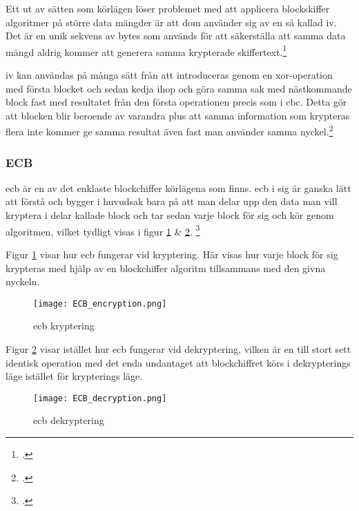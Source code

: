 Ett ut av sätten som körlägen löser problemet med att applicera blockskiffer algoritmer på
större data mängder är att dom använder sig av en så kallad \acrfull{iv}. Det är en unik sekvens
av bytes som används för att säkerställa att samma data mängd aldrig kommer att generera samma
krypterade skiffertext.\footcite{modesofoperation}

\acrshort{iv} kan användas på många sätt från att introduceras genom en
\gls{xor}-operation med första blocket och sedan kedja ihop och göra samma sak med nästkommande
block fast med resultatet från den första operationen precis som i \acrshort{cbc}. Detta gör att blocken blir beroende av varandra
plus att samma information som krypteras flera inte kommer ge samma resultat även fast man använder samma
nyckel.\footcite{modesofoperation}

\subsubsection{ECB}
\acrfull{ecb} är en av det enklaste blockchiffer körlägena som finns.
\acrshort{ecb} i sig är ganska lätt att förstå och bygger i huvudsak bara på
att man delar upp den data man vill kryptera i delar kallade block och tar sedan varje
block för sig och kör genom algoritmen, vilket tydligt visas i
figur \ref{fig:ecb-mode-enc} \& \ref{fig:ecb-mode-dec}.
\footcite{modesofoperation}

Figur \ref{fig:ecb-mode-enc} visar hur \acrshort{ecb} fungerar vid kryptering.
Här visas hur varje block för sig krypteras med hjälp av en blockchiffer algoritm
tillsammans med den givna nyckeln.

\begin{figure}[H]
    \texttt{[image: ECB\_encryption.png]}
    \caption{\acrlong{ecb} kryptering \cite{ecb-mode-enc-ref}}
    \label{fig:ecb-mode-enc}
\end{figure}

Figur \ref{fig:ecb-mode-dec} visar istället hur \acrshort{ecb} fungerar vid
dekryptering, vilken är en till stort sett identisk operation med det enda undantaget
att blockchiffret körs i dekrypterings läge istället för krypterings läge. %

\begin{figure}[H]
    \texttt{[image: ECB\_decryption.png]}
    \caption{\acrlong{ecb} dekryptering \cite{ecb-mode-dec-ref}}
    \label{fig:ecb-mode-dec}
\end{figure}

